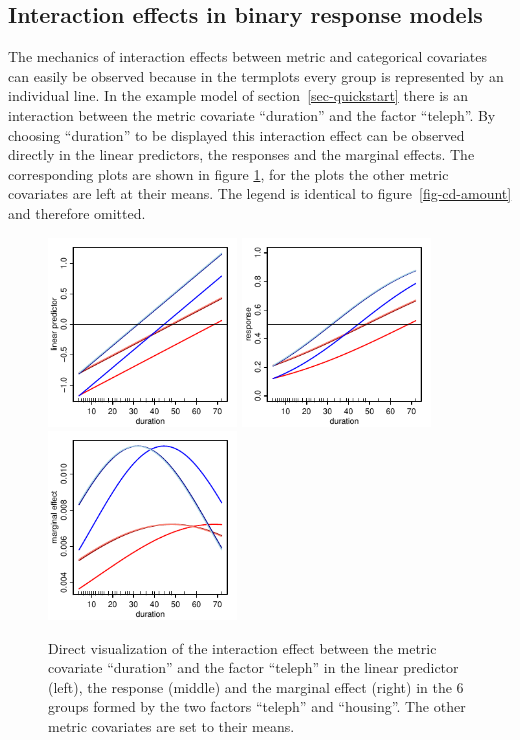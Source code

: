 \documentclass[nojss]{jss}
\newcommand{\quotes}[1]{``#1''}
\begin{document}
\subsection{Interaction effects in binary response models}
The mechanics of interaction effects between metric and categorical covariates can easily be observed because in the termplots  every group is represented by an individual line. In the example model of section~\ref{sec-quickstart} there is an interaction between the metric covariate \quotes{duration} and the factor \quotes{teleph}. By choosing \quotes{duration} to be displayed this interaction effect can be observed directly in the linear predictors, the responses and the marginal effects. The corresponding plots are shown in figure \ref{fig-cd-dur-1}, for the plots the other metric covariates are left at their means.  The legend is identical to figure~\ref{fig-cd-amount} and therefore omitted.
\begin{figure}[ht]
\centering
\includegraphics[width=5cm]{cd-dur-link} \includegraphics[width=5cm]{cd-dur-resp} \includegraphics[width=5cm]{cd-dur-marg}
\caption{Direct visualization of the interaction effect between the metric covariate \quotes{duration} and the factor \quotes{teleph} in the linear predictor (left), the response (middle) and the marginal effect (right) in the 6 groups formed by the two factors \quotes{teleph} and \quotes{housing}. The other metric covariates are set to their means.} \label{fig-cd-dur-1}
\end{figure}
\end{document}
